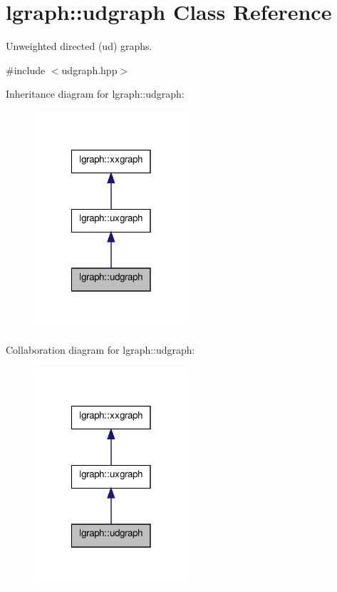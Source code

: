 \hypertarget{classlgraph_1_1udgraph}{\section{lgraph\-:\-:udgraph Class Reference}
\label{classlgraph_1_1udgraph}
}


Unweighted directed (ud) graphs.  




{\ttfamily \#include $<$udgraph.\-hpp$>$}



Inheritance diagram for lgraph\-:\-:udgraph\-:
\nopagebreak
\begin{figure}[H]
\begin{center}
\leavevmode
\includegraphics[width=162pt]{classlgraph_1_1udgraph__inherit__graph}
\end{center}
\end{figure}


Collaboration diagram for lgraph\-:\-:udgraph\-:
\nopagebreak
\begin{figure}[H]
\begin{center}
\leavevmode
\includegraphics[width=162pt]{classlgraph_1_1udgraph__coll__graph}
\end{center}
\end{figure}

